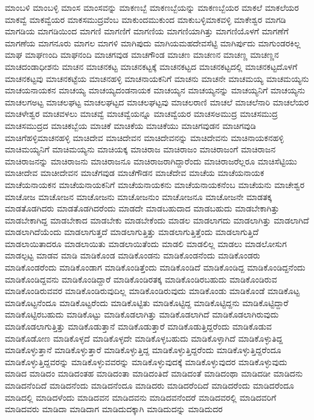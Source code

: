 {ಮಾಂಬಳಿ
ಮಾಂಬಳ್ಳಿ
ಮಾಂಸ
ಮಾಂಸವನ್ನು
ಮಾಕಣಬ್ಬೆ
ಮಾಕಣಬ್ಬೆಯನ್ನು
ಮಾಕಣಬ್ಬೆಯರ
ಮಾಕಲೆ
ಮಾಕಲೆಯರ
ಮಾಕವ್ವೆ
ಮಾಕವ್ವೆಯರ
ಮಾಕಸಮುದ್ರವೆಂಬ
ಮಾಕುಂದಮುಕುಂದ
ಮಾಕುಬಳ್ಳಿಮಾಕವಳ್ಳಿ
ಮಾಕೇಶ್ವರ
ಮಾಗಡಿ
ಮಾಗಡಿಯ
ಮಾಗಡಿಯಿಂದ
ಮಾಗಣಿ
ಮಾಗಣಿಗೆ
ಮಾಗಣಿಯ
ಮಾಗಣಿಯಾಗಿತ್ತು
ಮಾಗಣಿಯೊಳಗೆ
ಮಾಗಣೆಗೆ
ಮಾಗಣೆಯ
ಮಾಗನೂರು
ಮಾಗಲ
ಮಾಗಳಿ
ಮಾಗಿಪುದು
ಮಾಗಿಯಮಹದೇವಸೆಟ್ಟಿ
ಮಾಗಿರ್ಪುದು
ಮಾಗುಂಡರಕಿಲ್ಲ
ಮಾಘ
ಮಾಘಣಂದಿ
ಮಾಘನಂದಿ
ಮಾಚಗವುಡ
ಮಾಚಗೌಂಡ
ಮಾಚಣ
ಮಾಚಣನ
ಮಾಚಣ್ಣ
ಮಾಚಣ್ಣನ
ಮಾಚದಂಡಾಧೀಶನು
ಮಾಚನ
ಮಾಚನಕಟ್ಟ
ಮಾಚನಕಟ್ಟಕ್ಕೆ
ಮಾಚನಕಟ್ಟದ
ಮಾಚನಕಟ್ಟದಲ್ಲಿ
ಮಾಚನಕಟ್ಟದೊಳಗೆ
ಮಾಚನಕಟ್ಟವು
ಮಾಚನಕಟ್ಟೆಯ
ಮಾಚನಹಳ್ಳಿ
ಮಾಚನಾಯಕನಿಗೆ
ಮಾಚನು
ಮಾಚನೇ
ಮಾಚಮಯ್ಯ
ಮಾಚಮಯ್ಯನು
ಮಾಚಯನಾಯಕನ
ಮಾಚಯ್ಯ
ಮಾಚಯ್ಯದಂಡನಾಯಕ
ಮಾಚಯ್ಯನ
ಮಾಚಯ್ಯನನ್ನು
ಮಾಚಯ್ಯನಿಗೆ
ಮಾಚಯ್ಯನು
ಮಾಚಲಗಅಟ್ಟ
ಮಾಚಲಘಟ್ಟ
ಮಾಚಲಘಟ್ಟದ
ಮಾಚಲಘಟ್ಟವು
ಮಾಚಲರಾಣಿ
ಮಾಚಲೆ
ಮಾಚಲೆನಾರಿ
ಮಾಚಲೆಯರ
ಮಾಚಳೇಶ್ವರ
ಮಾಚವಳಲು
ಮಾಚವ್ವೆ
ಮಾಚವ್ವೆಯನ್ನೂ
ಮಾಚವ್ವೆಯರ
ಮಾಚಸಅಮುದ್ರ
ಮಾಚಸಮುದ್ರ
ಮಾಚಸಮುದ್ರದ
ಮಾಚಿಕಬ್ಬೆಯ
ಮಾಚಿಕೆ
ಮಾಚಿಕೆಯ
ಮಾಚಿಕೆಯು
ಮಾಚಿಗವುಡನ
ಮಾಚಿಗವುಡಿ
ಮಾಚಿಗೆಹಳ್ಳಿಮಾಚನಹಳ್ಳಿ
ಮಾಚಿದೇವ
ಮಾಚಿದೇವನ
ಮಾಚಿದೇವನನ್ನು
ಮಾಚಿದೇವನು
ಮಾಚಿನಾಯಕನಹಳ್ಳಿ
ಮಾಚಿಮಯ್ಯನಿಗೆ
ಮಾಚಿಮಯ್ಯನು
ಮಾಚಿಯಕ್ಕ
ಮಾಚಿರಾಜ
ಮಾಚಿರಾಜಂ
ಮಾಚಿರಾಜಂಗೆ
ಮಾಚಿರಾಜನ
ಮಾಚಿರಾಜನನ್ನು
ಮಾಚಿರಾಜನು
ಮಾಚಿರಾಜನೂ
ಮಾಚಿರಾಜರಾಗಿದ್ದಾರೆಂದು
ಮಾಚಿರಾಜರೆಲ್ಲರೂ
ಮಾಚಿಸೆಟ್ಟಿಯು
ಮಾಚೀದೇವ
ಮಾಚೀದೇವನ
ಮಾಚೆಗವುಡ
ಮಾಚೆಗೌಡನ
ಮಾಚೆದೇವ
ಮಾಚೆಯ
ಮಾಚೆಯನಾಯಕ
ಮಾಚೆಯನಾಯಕನ
ಮಾಚೆಯನಾಯಕನಿಗೆ
ಮಾಚೆಯನಾಯಕನು
ಮಾಚೆಯನಾಯಕನೆಂಬ
ಮಾಚೆಯನು
ಮಾಚೇಶ್ವರ
ಮಾಚೋಜ
ಮಾಚೋಜನ
ಮಾಚೋಜನು
ಮಾಚೋಜನುಂ
ಮಾಚೋಜನೂ
ಮಾಚೋಜನೇ
ಮಾಡತಕ್ಕ
ಮಾಡತೊಡಗಿದರು
ಮಾಡತೊಡಗಿದರೆಂದು
ಮಾಡದೇ
ಮಾಡಬಹುದಾದ
ಮಾಡಬಹುದು
ಮಾಡಬೇಕಾಗಿತ್ತು
ಮಾಡಬೇಕಾಗಿದ್ದ
ಮಾಡಬೇಕಾದ
ಮಾಡಬೇಕು
ಮಾಡಬೇಕೆಂದು
ಮಾಡಲ
ಮಾಡಲಾಗದು
ಮಾಡಲಾಗಿತ್ತು
ಮಾಡಲಾಗಿದೆ
ಮಾಡಲಾಗಿದೆಯೆಂದು
ಮಾಡಲಾಗುತ್ತದೆ
ಮಾಡಲಾಗುತ್ತಿತ್ತು
ಮಾಡಲಾಗುತ್ತಿತ್ತೆಂದು
ಮಾಡಲಾಗುತ್ತಿದೆ
ಮಾಡಲಾಯಿತಾದರೂ
ಮಾಡಲಾಯಿತು
ಮಾಡಲಾಯಿತೆಂದು
ಮಾಡಲಿ
ಮಾಡಲಿಲ್ಲ
ಮಾಡಲು
ಮಾಡಲೋಸುಗ
ಮಾಡಲ್ಪಟ್ಟ
ಮಾಡವ
ಮಾಡಿ
ಮಾಡಿಕೊಂಡ
ಮಾಡಿಕೊಂಡನು
ಮಾಡಿಕೊಂಡನೆಂದು
ಮಾಡಿಕೊಂಡರು
ಮಾಡಿಕೊಂಡರೆಂದು
ಮಾಡಿಕೊಂಡಾಗ
ಮಾಡಿಕೊಂಡಿತ್ತೆಂದು
ಮಾಡಿಕೊಂಡಿದೆ
ಮಾಡಿಕೊಂಡಿದ್ದ
ಮಾಡಿಕೊಂಡಿದ್ದನೆಂದು
ಮಾಡಿಕೊಂಡಿದ್ದವನು
ಮಾಡಿಕೊಂಡಿದ್ದಾರೆ
ಮಾಡಿಕೊಂಡಿರತಕ್ಕ
ಮಾಡಿಕೊಂಡಿರಬಹುದು
ಮಾಡಿಕೊಂಡಿರುವ
ಮಾಡಿಕೊಂಡಿರುವವರ
ಮಾಡಿಕೊಂಡಿರುವುದಿಲ್ಲ
ಮಾಡಿಕೊಂಡಿರುವುದು
ಮಾಡಿಕೊಂಡು
ಮಾಡಿಕೊಂಡೆ
ಮಾಡಿಕೊಟ್ಟ
ಮಾಡಿಕೊಟ್ಟನೆಂದೂ
ಮಾಡಿಕೊಟ್ಟರೆಂದು
ಮಾಡಿಕೊಟ್ಟಿತು
ಮಾಡಿಕೊಟ್ಟಿದ್ದ
ಮಾಡಿಕೊಟ್ಟಿದ್ದನು
ಮಾಡಿಕೊಟ್ಟಿದ್ದಾರೆ
ಮಾಡಿಕೊಟ್ಟಿರಬಹುದು
ಮಾಡಿಕೊಟ್ಟು
ಮಾಡಿಕೊಡಲಾಗಿತ್ತು
ಮಾಡಿಕೊಡಲಾಗಿದೆ
ಮಾಡಿಕೊಡಲಾಗಿರುವುದು
ಮಾಡಿಕೊಡಲಾಗುತ್ತಿತ್ತು
ಮಾಡಿಕೊಡುತ್ತಾನೆ
ಮಾಡಿಕೊಡುತ್ತಾರೆ
ಮಾಡಿಕೊಡುತ್ತಿದ್ದರೆಂದು
ಮಾಡಿಕೊಡುವ
ಮಾಡಿಕೊಡೋಣ
ಮಾಡಿಕೊಳ್ಳದೆ
ಮಾಡಿಕೊಳ್ಳದೇ
ಮಾಡಿಕೊಳ್ಳಬಹುದು
ಮಾಡಿಕೊಳ್ಳಾಗಿದೆ
ಮಾಡಿಕೊಳ್ಳುತಿದ್ದ
ಮಾಡಿಕೊಳ್ಳುತ್ತಾನೆ
ಮಾಡಿಕೊಳ್ಳುತ್ತಾರೆ
ಮಾಡಿಕೊಳ್ಳುತ್ತಿದ್ದ
ಮಾಡಿಕೊಳ್ಳುತ್ತಿದ್ದರೆಂದು
ಮಾಡಿಕೊಳ್ಳುತ್ತಿದ್ದರೆಂದೂ
ಮಾಡಿಕೊಳ್ಳುತ್ತಿದ್ದವರನ್ನು
ಮಾಡಿಕೊಳ್ಳುವವರನ್ನು
ಮಾಡಿಕೊಳ್ಳುವುದಕ್ಕೆ
ಮಾಡಿಕೊಳ್ಳುವುದರ
ಮಾಡಿಕೊಳ್ಳುವುದು
ಮಾಡಿದ
ಮಾಡಿದಂ
ಮಾಡಿದಂತಹ
ಮಾಡಿದಂತಾ
ಮಾಡಿದಂತಿದೆ
ಮಾಡಿದಂತೆ
ಮಾಡಿದಂಥಾ
ಮಾಡಿದಡೀ
ಮಾಡಿದನು
ಮಾಡಿದನೆಂದಿದೆ
ಮಾಡಿದನೆಂದು
ಮಾಡಿದನೆಂದೂ
ಮಾಡಿದರು
ಮಾಡಿದರೆಂದಿದೆ
ಮಾಡಿದರೆಂದು
ಮಾಡಿದರೆಂದೂ
ಮಾಡಿದಲ್ಲಿ
ಮಾಡಿದಳೆಂದು
ಮಾಡಿದವನ
ಮಾಡಿದವನು
ಮಾಡಿದವನೆಂದರೆ
ಮಾಡಿದವರಲ್ಲಿ
ಮಾಡಿದವರಿಗೆ
ಮಾಡಿದವರು
ಮಾಡಿದಾ
ಮಾಡಿದಾಗ
ಮಾಡಿದುದಕ್ಕಾಗಿ
ಮಾಡಿದುದನ್ನು
ಮಾಡಿದುದರ
}
